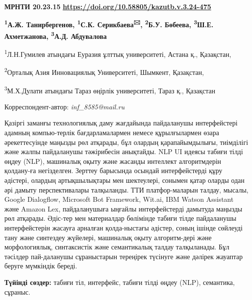 \newpage
{\bfseries МРНТИ 20.23.15}
\hfill {\bfseries \href{https://doi.org/10.58805/kazutb.v.3.24-475}{https://doi.org/10.58805/kazutb.v.3.24-475}}


\begin{center}
{\bfseries \textsuperscript{1}А.Ж. Танирбергенов, \textsuperscript{1}С.К.
Серикбаева\textsuperscript{🖂}, \textsuperscript{2}Б.У. Бөбеева,
\textsuperscript{3}Ш.Е. Ахметжанова, \textsuperscript{3}А.Д. Абдувалова}

\textsuperscript{1}Л.Н.Гумилев атындағы Еуразия ұлттық университеті,
Астана қ., Қазақстан,

\textsuperscript{2}Орталық Азия Инновациялық Университеті, Шымкент,
Қазақстан,

\textsuperscript{3}М.Х.Дулати атындағы Тараз өңірлік университеті, Тараз
қ., Қазақстан
\end{center}
Корреспондент-автор:  \emph{inf\_8585@mail.ru}\vspace{0.5cm}

Қазіргі заманғы технологиялық даму жағдайында пайдаланушы интерфейстері
адамның компью-терлік бағдарламалармен немесе құрылғылармен өзара
әрекеттесуінде маңызды рөл атқарады, бұл олардың қарапайымдылығы,
тиімділігі және жалпы пайдаланушы тәжірибесін анықтайды. NLP UI идеясы
табиғи тілді өңдеу (NLP), машиналық оқыту және жасанды интеллект
алгоритмдерін қолдану-ға негізделген. Зерттеу барысында осындай
интерфейстерді құру әдістері, олардың артықшылықтары мен шектеулері,
сонымен қатар оларды одан әрі дамыту перспективалары талқыланды. ТТИ
платфор-маларын талдау, мысалы, Google Dialogflow, Microsoft Bot
Framework, Wit.ai, IBM Watson Assistant және Amazon Lex, пайдаланушыға
ыңғайлы интерфейстерді дамытуда маңызды рөл атқарады. Әдіс-тер мен
материалдар бөлімінде табиғи тілде пайдаланушы интерфейстерін жасауға
арналған қолда-ныстағы әдістер, соның ішінде сөйлеуді тану және синтездеу
жүйелері, машиналық оқыту алгоритм-дері және морфологиялық, синтаксистік
және семантикалық талдау талқыланады. Бұл тәсілдер пай-даланушы
сұраныстарын тереңірек түсінуге және дәлірек жауаптар беруге мүмкіндік
береді.

{\bfseries Түйінді сөздер:} табиғи тіл, интерфейс, табиғи тілді өңдеу
(NLP), семантика, сұраныс.



